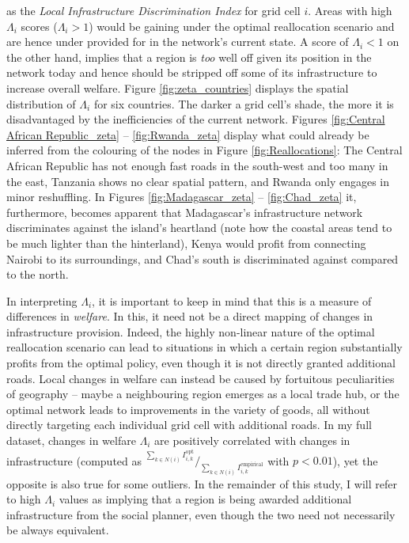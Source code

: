 \documentclass[11pt, oneside]{article}   	%
\begin{document}
as the \emph{Local Infrastructure Discrimination Index} for grid cell $i$. Areas with high $\Lambda_{i}$ scores ($\Lambda_{i} > 1$) would be gaining under the optimal reallocation scenario and are hence under provided for in the network's current state. A score of $\Lambda_{i} < 1$ on the other hand, implies that a region is \emph{too} well off given its position in the network today and hence should be stripped off some of its infrastructure to increase overall welfare. Figure \eqref{fig:zeta_countries} displays the spatial distribution of $\Lambda_{i}$ for six countries. The darker a grid cell's shade, the more it is disadvantaged by the inefficiencies of the current network. Figures \eqref{fig:Central African Republic_zeta} -- \eqref{fig:Rwanda_zeta} display what could already be inferred from the colouring of the nodes in Figure \eqref{fig:Reallocations}: The Central African Republic has not enough fast roads in the south-west and too many in the east, Tanzania shows no clear spatial pattern, and Rwanda only engages in minor reshuffling. In Figures \eqref{fig:Madagascar_zeta} -- \eqref{fig:Chad_zeta} it, furthermore, becomes apparent that Madagascar's infrastructure network discriminates against the island's heartland (note how the coastal areas tend to be much lighter than the hinterland), Kenya would profit from connecting Nairobi to its surroundings, and Chad's south is discriminated against compared to the north.

In interpreting $\Lambda_{i}$, it is important to keep in mind that this is a measure of differences in \emph{welfare}. In this, it need not be a direct mapping of changes in infrastructure provision. Indeed, the highly non-linear nature of the optimal reallocation scenario can lead to situations in which a certain region substantially profits from the optimal policy, even though it is not directly granted additional roads. Local changes in welfare can instead be caused by fortuitous peculiarities of geography -- maybe a neighbouring region emerges as a local trade hub, or the optimal network leads to improvements in the variety of goods, all without directly targeting each individual grid cell with additional roads. In my full dataset, changes in welfare $\Lambda_{i}$ are positively correlated with changes in infrastructure (computed as $^{\sum_{k \in N(i)}^{}I_{i,k}^{\textrm{opt}}} / _{\sum_{k \in N(i)}^{}I_{i,k}^{\textrm{empirical}}}$ with $p < 0.01$), yet the opposite is also true for some outliers. In the remainder of this study, I will refer to high $\Lambda_{i}$ values as implying that a region is being awarded additional infrastructure from the social planner, even though the two need not necessarily be always equivalent.
\end{document}
